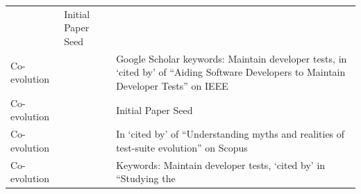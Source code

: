 \documentclass[]{book}
\begin{document}
\begin{longtable}[]{@{}lll@{}}
\begin{minipage}[t]{0.41\columnwidth}
\citet{pinto2012understanding}\strut
\end{minipage} & \begin{minipage}[t]{0.32\columnwidth}\raggedright\strut
Initial Paper Seed\strut
\end{minipage}\tabularnewline
\begin{minipage}[t]{0.19\columnwidth}\raggedright\strut
Co-evolution\strut
\end{minipage} & \begin{minipage}[t]{0.41\columnwidth}\raggedright\strut
\citet{marsavina2014}\strut
\end{minipage} & \begin{minipage}[t]{0.32\columnwidth}\raggedright\strut
Google Scholar keywords: Maintain developer tests, in `cited by' of
``Aiding Software Developers to Maintain Developer Tests'' on IEEE\strut
\end{minipage}\tabularnewline
\begin{minipage}[t]{0.19\columnwidth}\raggedright\strut
Co-evolution\strut
\end{minipage} & \begin{minipage}[t]{0.41\columnwidth}\raggedright\strut
\citet{zaidman2011studying}\strut
\end{minipage} & \begin{minipage}[t]{0.32\columnwidth}\raggedright\strut
Initial Paper Seed\strut
\end{minipage}\tabularnewline
\begin{minipage}[t]{0.19\columnwidth}\raggedright\strut
Co-evolution\strut
\end{minipage} & \begin{minipage}[t]{0.41\columnwidth}\raggedright\strut
\citet{greiler2013}\strut
\end{minipage} & \begin{minipage}[t]{0.32\columnwidth}\raggedright\strut
In `cited by' of ``Understanding myths and realities of test-suite
evolution'' on Scopus\strut
\end{minipage}\tabularnewline
\begin{minipage}[t]{0.19\columnwidth}\raggedright\strut
Co-evolution\strut
\end{minipage} & \begin{minipage}[t]{0.41\columnwidth}\raggedright\strut
\citet{hurdugaci2012}\strut
\end{minipage} & \begin{minipage}[t]{0.32\columnwidth}\raggedright\strut
Keywords: Maintain developer tests, `cited by' in ``Studying the

\end{minipage}
\end{longtable}
\end{document}
